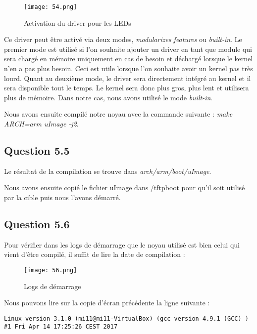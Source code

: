 \documentclass[a4paper,12pt]{report}
\begin{document}
\newpage
\begin{figure}[h]
	\centering
		\texttt{[image: 54.png]}
		\caption{Activation du driver pour les LEDs}
\end{figure}

\newpage

Ce driver peut être activé via deux modes, \textit{modularizes features} ou \textit{built-in}. Le premier mode est utilisé si l'on souhaite ajouter un driver en tant que module qui sera chargé en mémoire uniquement en cas de besoin et déchargé lorsque le kernel n'en a pas plus besoin. Ceci est utile lorsque l'on souhaite avoir un kernel pas très lourd.
Quant au deuxième mode, le driver sera directement intégré au kernel et il sera disponible tout le temps. Le kernel sera donc plus gros, plus lent et utilisera plus de mémoire.
Dans notre cas, nous avons utilisé le mode \textit{built-in}.\newline

Nous avons ensuite compilé notre noyau avec la commande suivante : \textit{make ARCH=arm uImage -j2}.

\subsection{Question 5.5}

Le résultat de la compilation se trouve dans \textit{arch/arm/boot/uImage}.

Nous avons ensuite copié le fichier uImage dans /tftpboot pour qu'il soit utilisé par la cible puis nous l'avons démarré.

\newpage

\subsection{Question 5.6}

Pour vérifier dans les logs de démarrage que le noyau utilisé est bien celui qui vient d'être compilé, il suffit de lire la date de compilation :

\begin{figure}[h]
	\centering
		\texttt{[image: 56.png]}
		\caption{Logs de démarrage}
\end{figure}

Nous pouvons lire sur la copie d'écran précédente la ligne suivante : 
\begin{verbatim}
Linux version 3.1.0 (mi11@mi11-VirtualBox) (gcc version 4.9.1 (GCC) ) 
#1 Fri Apr 14 17:25:26 CEST 2017
\end{verbatim}
\end{document}
